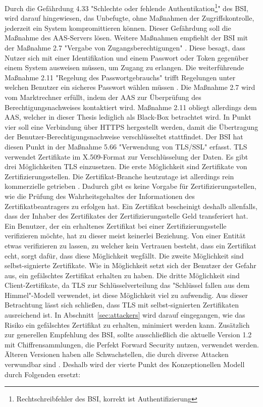 \documentclass[11pt,a4paper]{report}
\begin{document}
Durch die Gefährdung 4.33 "Schlechte oder fehlende Authentikation\footnote{Rechtschreibfehler des BSI, korrekt ist Authentifizierung}" \cite{bsi_g4033} des BSI, wird darauf hingewiesen, das Unbefugte, ohne Maßnahmen der Zugriffskontrolle, jederzeit ein System kompromittieren können. Dieser Gefährdung soll die Maßnahme des AAS-Servers lösen. Weitere Maßnahmen empfiehlt der BSI mit der Maßnahme 2.7 "Vergabe von Zugangsberechtigungen" \cite{bsi_m2007}. Diese besagt, dass Nutzer sich mit einer Identifikation und einem Passwort oder Token gegenüber einem System ausweisen müssen, um Zugang zu erlangen. Die weiterführende Maßnahme 2.11 "Regelung des Passwortgebrauchs" trifft Regelungen unter welchen Benutzer ein sicheres Passwort wählen müssen \cite{bsi_m2011}. Die Maßnahme 2.7 wird vom Marktrechner erfüllt, indem der AAS zur Überprüfung des Berechtigungsnachweises kontaktiert wird. Maßnahme 2.11 obliegt allerdings dem AAS, welcher in dieser Thesis lediglich als Black-Box betrachtet wird. In Punkt vier soll eine Verbindung über HTTPS hergestellt werden, damit die Übertragung der Benutzer-Berechtigungsnachweise verschlüsseltet stattfindet. Der BSI hat diesen Punkt in der Maßnahme 5.66 "Verwendung von TLS/SSL" \cite{bsi_m5066} erfasst. TLS verwendet Zertifikate im X.509-Format zur Verschlüsselung der Daten. Es gibt drei Möglichkeiten TLS einzusetzen. Die erste Möglichkeit sind Zertifikate von Zertifizierungsstellen. Die Zertifikat-Branche heutzutage ist allerdings rein kommerzielle getrieben \cite[s.~50]{gutmann}. Dadurch gibt es keine Vorgabe für Zertifizierungsstellen, wie die Prüfung des Wahrheitsgehaltes der Informationen des Zertifikatbeantragers zu erfolgen hat. Ein Zertifikat bescheinigt deshalb allenfalls, dass der Inhaber des Zertifikates der Zertifizierungsstelle Geld transferiert hat. Ein Benutzer, der ein erhaltenes Zertifikat bei einer Zertifizierungsstelle verifizieren möchte, hat zu dieser meist keinerlei Beziehung. Von einer Entität etwas verifizieren zu lassen, zu welcher kein Vertrauen besteht, dass ein Zertifikat echt, sorgt dafür, dass diese Möglichkeit wegfällt. Die zweite Möglichkeit sind selbst-signierte Zertifikate. Wie in Möglichkeit setzt sich der Benutzer der Gefahr aus, ein gefälschtes Zertifikat erhalten zu haben. Die dritte Möglichkeit sind Client-Zertifikate, da TLS zur Schlüsselverteilung das "Schlüssel fallen aus dem Himmel"-Modell verwendet, ist diese Möglichkeit viel zu aufwendig. Aus dieser Betrachtung lässt sich schließen, dass TLS mit selbst-signierten Zertifikaten ausreichend ist. In Abschnitt~\ref{sec:attackers} wird darauf eingegangen, wie das Risiko ein gefälschtes Zertifikat zu erhalten, minimiert werden kann. Zusätzlich zur generellen Empfehlung des BSI, sollte ausschließlich die aktuelle Version 1.2 mit Chiffrensammlungen, die Perfekt Forward Security nutzen, verwendet werden. Älteren Versionen haben alle Schwachstellen, die durch diverse Attacken verwundbar sind \cite{ssl_lighttpd}. Deshalb wird der vierte Punkt des Konzeptionellen Modell durch Folgenden ersetzt:
\end{document}
